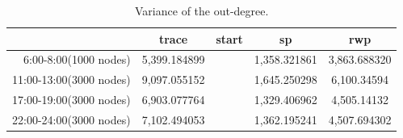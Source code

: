 \begin{table}[!t]
\caption{Variance of the out-degree.}\label{table_variance_out}
\centering
\begin{tabular}{r|c|c|c|c}
\hline
	&trace	&start	&sp	&rwp\\
\hline
 6:00-8:00(1000 nodes)	&
5,399.184899&&	1,358.321861&	3,863.688320\\
\hline
 11:00-13:00(3000 nodes)&
9,097.055152&&	1,645.250298&	6,100.34594\\
\hline
 17:00-19:00(3000 nodes)&
6,903.077764&&	1,329.406962&	4,505.14132\\
\hline
 22:00-24:00(3000 nodes)&
7,102.494053&&	1,362.195241&	4,507.694302\\
\hline
\end{tabular}
\end{table}

